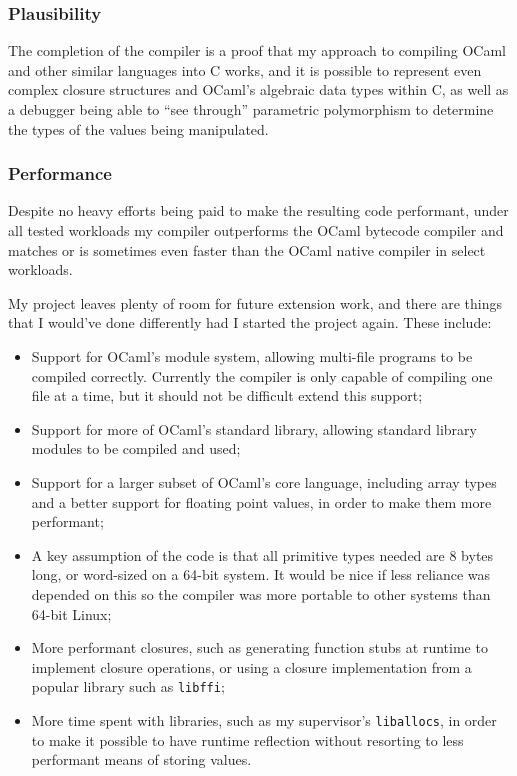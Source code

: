\documentclass[12pt,a4paper,twoside,openright]{report}
\begin{document}
\subsubsection{Plausibility}
The completion of the compiler is a proof that my approach to compiling OCaml 
and other similar languages into C works, and it is possible to represent even 
complex closure structures and OCaml's algebraic data types within C, as well 
as a debugger being able to ``see through'' parametric polymorphism to 
determine the types of the values being manipulated.

\subsubsection{Performance}
Despite no heavy efforts being paid to make the resulting code performant, 
under all tested workloads my compiler outperforms the OCaml bytecode compiler 
and matches or is sometimes even faster than the OCaml native compiler in 
select workloads.

My project leaves plenty of room for future extension work, and there are 
things that I would've done differently had I started the project again. These 
include:

\begin{itemize}
    \item Support for OCaml's module system, allowing multi-file programs to be 
    compiled correctly. Currently the compiler is only capable of compiling one 
    file at a time, but it should not be difficult extend this support;
    \item Support for more of OCaml's standard library, allowing standard 
    library modules to be compiled and used;
    \item Support for a larger subset of OCaml's core language, including array 
    types and a better support for floating point values, in order to make them 
    more performant;
    \item A key assumption of the code is that all primitive types needed are 8 
    bytes long, or word-sized on a 64-bit system. It would be nice if less 
    reliance was depended on this so the compiler was more portable to other 
    systems than 64-bit Linux;
    \item More performant closures, such as generating function stubs at 
    runtime to implement closure operations, or using a closure implementation 
    from a popular library such as \texttt{libffi};
    \item More time spent with libraries, such as my supervisor's 
    \texttt{liballocs}, in order to make it possible to have runtime reflection 
    without resorting to less performant means of storing values.
\end{itemize}
\end{document}
